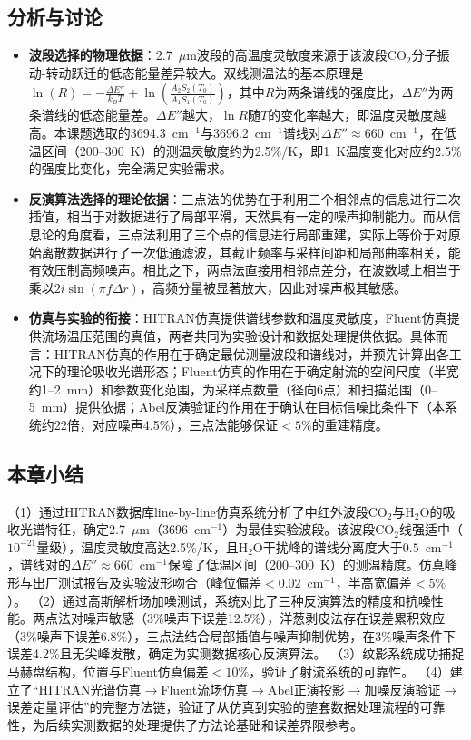 	\subsection{分析与讨论}
	\begin{itemize}
		\item \textbf{波段选择的物理依据}：2.7~$\mu$m波段的高温度灵敏度来源于该波段CO$_2$分子振动-转动跃迁的低态能量差异较大。双线测温法的基本原理是$\ln(R) = -\frac{\Delta E''}{k_B T} + \ln\left(\frac{A_2 S_2(T_0)}{A_1 S_1(T_0)}\right)$，其中$R$为两条谱线的强度比，$\Delta E''$为两条谱线的低态能量差。$\Delta E''$越大，$\ln R$随$T$的变化率越大，即温度灵敏度越高。本课题选取的3694.3~cm$^{-1}$与3696.2~cm$^{-1}$谱线对$\Delta E'' \approx 660$~cm$^{-1}$，在低温区间（200--300~K）的测温灵敏度约为2.5\%/K，即1~K温度变化对应约2.5\%的强度比变化，完全满足实验需求。
		\item \textbf{反演算法选择的理论依据}：三点法的优势在于利用三个相邻点的信息进行二次插值，相当于对数据进行了局部平滑，天然具有一定的噪声抑制能力。而从信息论的角度看，三点法利用了三个点的信息进行局部重建，实际上等价于对原始离散数据进行了一次低通滤波，其截止频率与采样间距和局部曲率相关，能有效压制高频噪声。相比之下，两点法直接用相邻点差分，在波数域上相当于乘以$2i\sin(\pi f \Delta r)$，高频分量被显著放大，因此对噪声极其敏感。
		\item \textbf{仿真与实验的衔接}：HITRAN仿真提供谱线参数和温度灵敏度，Fluent仿真提供流场温压范围的真值，两者共同为实验设计和数据处理提供依据。具体而言：HITRAN仿真的作用在于确定最优测量波段和谱线对，并预先计算出各工况下的理论吸收光谱形态；Fluent仿真的作用在于确定射流的空间尺度（半宽约1--2~mm）和参数变化范围，为采样点数量（径向6点）和扫描范围（0--5~mm）提供依据；Abel反演验证的作用在于确认在目标信噪比条件下（本系统约22倍，对应噪声4.5\%），三点法能够保证$<5\%$的重建精度。
	\end{itemize}
	\subsection{本章小结}
	（1）通过HITRAN数据库line-by-line仿真系统分析了中红外波段CO$_2$与H$_2$O的吸收光谱特征，确定2.7~$\mu$m（3696~cm$^{-1}$）为最佳实验波段。该波段CO$_2$线强适中（$10^{-21}$量级），温度灵敏度高达2.5\%/K，且H$_2$O干扰峰的谱线分离度大于$0.5$~cm$^{-1}$，谱线对的$\Delta E'' \approx 660$~cm$^{-1}$保障了低温区间（200--300~K）的测温精度。仿真峰形与出厂测试报告及实验波形吻合（峰位偏差$<0.02$~cm$^{-1}$，半高宽偏差$<5\%$）。
	（2）通过高斯解析场加噪测试，系统对比了三种反演算法的精度和抗噪性能。两点法对噪声敏感（3\%噪声下误差12.5\%），洋葱剥皮法存在误差累积效应（3\%噪声下误差6.8\%），三点法结合局部插值与噪声抑制优势，在3\%噪声条件下误差4.2\%且无尖峰发散，确定为实测数据核心反演算法。
	（3）纹影系统成功捕捉马赫盘结构，位置与Fluent仿真偏差$<10\%$，验证了射流系统的可靠性。
	（4）建立了“HITRAN光谱仿真$\to$Fluent流场仿真$\to$Abel正演投影$\to$加噪反演验证$\to$误差定量评估”的完整方法链，验证了从仿真到实验的整套数据处理流程的可靠性，为后续实测数据的处理提供了方法论基础和误差界限参考。

